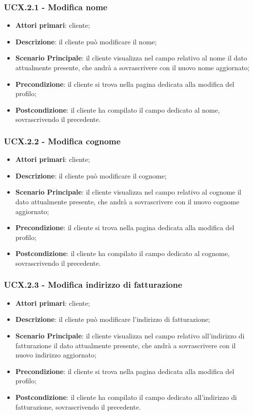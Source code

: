 \subsubsection{UCX.2.1 - Modifica nome}
\begin{itemize}
\item \textbf{Attori primari}: cliente;
\item \textbf{Descrizione}: il cliente può modificare il nome;
\item \textbf{Scenario Principale}: il cliente visualizza nel campo relativo al nome il dato attualmente presente, che andrà a sovrascrivere con il nuovo nome aggiornato;
\item \textbf{Precondizione}: il cliente si trova nella pagina dedicata alla modifica del profilo;
\item \textbf{Postcondizione}: il cliente ha compilato il campo dedicato al nome, sovrascrivendo il precedente.
\end{itemize}

\subsubsection{UCX.2.2 - Modifica cognome}
\begin{itemize}
\item \textbf{Attori primari}: cliente;
\item \textbf{Descrizione}: il cliente può modificare il cognome;
\item \textbf{Scenario Principale}: il cliente visualizza nel campo relativo al cognome il dato attualmente presente, che andrà a sovrascrivere con il nuovo cognome aggiornato;
\item \textbf{Precondizione}: il cliente si trova nella pagina dedicata alla modifica del profilo;
\item \textbf{Postcondizione}: il cliente ha compilato il campo dedicato al cognome, sovrascrivendo il precedente.
\end{itemize}

\subsubsection{UCX.2.3 - Modifica indirizzo di fatturazione}
\begin{itemize}
\item \textbf{Attori primari}: cliente;
\item \textbf{Descrizione}: il cliente può modificare l'indirizzo di fatturazione;
\item \textbf{Scenario Principale}: il cliente visualizza nel campo relativo all'indirizzo di fatturazione il dato attualmente presente, che andrà a sovrascrivere con il nuovo indirizzo aggiornato;
\item \textbf{Precondizione}: il cliente si trova nella pagina dedicata alla modifica del profilo;
\item \textbf{Postcondizione}: il cliente ha compilato il campo dedicato all'indirizzo di fatturazione, sovrascrivendo il precedente.
\end{itemize}

